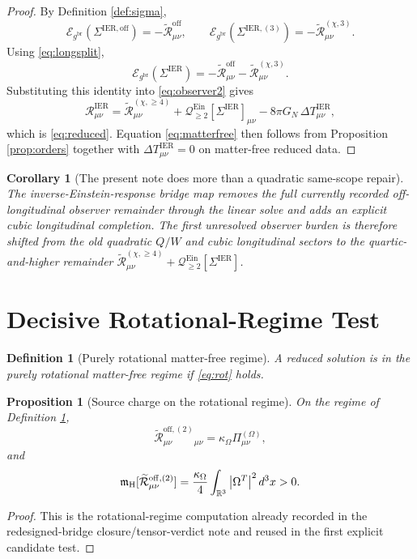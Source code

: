 \documentclass[11pt]{article}
\newcommand{\ReBridge}{g^{\mathrm{br}}}
\newcommand{\SigmaIER}{\Sigma^{\mathrm{IER}}}
\newcommand{\SigmaOff}{\Sigma^{\mathrm{IER,off}}}
\newcommand{\SigmaLongThree}{\Sigma^{\mathrm{IER},(3)}}
\newcommand{\ReOff}{\widetilde{\mathcal R}_{\mu\nu}^{\mathrm{off}}}
\newcommand{\ReOffTwo}{\widetilde{\mathcal R}_{\mu\nu}^{\mathrm{off},(2)}}
\newcommand{\ReLongThree}{\widetilde{\mathcal R}_{\mu\nu}^{(\chi,3)}}
\newcommand{\ReLongFour}{\widetilde{\mathcal R}_{\mu\nu}^{(\chi,\ge 4)}}
\newcommand{\DeltaTIER}{\Delta T_{\mu\nu}^{\mathrm{IER}}}
\newcommand{\EinLin}{\mathcal E_{\ReBridge}}
\newcommand{\EinQuad}{\mathcal Q_{\ge 2}^{\mathrm{Ein}}}
\newcommand{\HamCharge}{\mathfrak m_{\mathrm H}}
\newcommand{\PiOmega}{\Pi^{(\Omega)}}
\newtheorem{definition}{Definition}
\newtheorem{proposition}{Proposition}
\newtheorem{corollary}{Corollary}
\begin{document}
\begin{proof}
By Definition \ref{def:sigma},
\[
\EinLin(\SigmaOff)=-\ReOff,
\qquad
\EinLin(\SigmaLongThree)=-\ReLongThree.
\]
Using \eqref{eq:longsplit},
\[
\EinLin(\SigmaIER)
=
-\ReOff-\ReLongThree.
\]
Substituting this identity into \eqref{eq:observer2} gives
\[
\mathcal R_{\mu\nu}^{\mathrm{IER}}
=
\ReLongFour
+\EinQuad[\SigmaIER]_{\mu\nu}
-8\pi G_N\,\DeltaTIER,
\]
which is \eqref{eq:reduced}. Equation \eqref{eq:matterfree} then follows from Proposition \ref{prop:orders} together with \(\DeltaTIER=0\) on matter-free reduced data.
\end{proof}

\begin{corollary}[The present note does more than a quadratic same-scope repair]
\label{cor:scope}
The inverse-Einstein-response bridge map removes the full currently recorded off-longitudinal observer remainder through the linear solve and adds an explicit cubic longitudinal completion. The first unresolved observer burden is therefore shifted from the old quadratic \(Q/W\) and cubic longitudinal sectors to the quartic-and-higher remainder \(\ReLongFour+\EinQuad[\SigmaIER]\).
\end{corollary}

\section{Decisive Rotational-Regime Test}

\begin{definition}[Purely rotational matter-free regime]
\label{def:rotregime}
A reduced solution is in the \emph{purely rotational matter-free regime} if \eqref{eq:rot} holds.
\end{definition}

\begin{proposition}[Source charge on the rotational regime]
\label{prop:charge}
On the regime of Definition \ref{def:rotregime},
\begin{equation}
\ReOffTwo{}_{\mu\nu}
=
\kappa_\Omega\PiOmega_{\mu\nu},
\label{eq:offrot}
\end{equation}
and
\begin{equation}
\HamCharge[\ReOffTwo]
=
\frac{\kappa_\Omega}{4}
\int_{\mathbb R^3}\abs{\Omega^T}^2\,d^3x
>0.
\label{eq:chargeW}
\end{equation}
\end{proposition}

\begin{proof}
This is the rotational-regime computation already recorded in the redesigned-bridge closure/tensor-verdict note and reused in the first explicit candidate test.
\end{proof}
\end{document}
